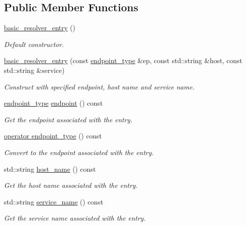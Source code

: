 \subsection*{Public Member Functions}
\begin{DoxyCompactItemize}
\item 
\hyperlink{classasio_1_1ip_1_1basic__resolver__entry_a340f12fc439142f447785325b313d890}{basic\+\_\+resolver\+\_\+entry} ()
\begin{DoxyCompactList}\small\item\em Default constructor. \end{DoxyCompactList}\item 
\hyperlink{classasio_1_1ip_1_1basic__resolver__entry_ac3f49bedc66820627952253c9dca35ea}{basic\+\_\+resolver\+\_\+entry} (const \hyperlink{classasio_1_1ip_1_1basic__resolver__entry_ad0d9f222f3a4897afa941c35e1a90074}{endpoint\+\_\+type} \&ep, const std\+::string \&host, const std\+::string \&service)
\begin{DoxyCompactList}\small\item\em Construct with specified endpoint, host name and service name. \end{DoxyCompactList}\item 
\hyperlink{classasio_1_1ip_1_1basic__resolver__entry_ad0d9f222f3a4897afa941c35e1a90074}{endpoint\+\_\+type} \hyperlink{classasio_1_1ip_1_1basic__resolver__entry_ade049c1db52069e46f5cc933f1979a74}{endpoint} () const 
\begin{DoxyCompactList}\small\item\em Get the endpoint associated with the entry. \end{DoxyCompactList}\item 
\hyperlink{classasio_1_1ip_1_1basic__resolver__entry_a343af6c1865a960c2515f038ab11c1f6}{operator endpoint\+\_\+type} () const 
\begin{DoxyCompactList}\small\item\em Convert to the endpoint associated with the entry. \end{DoxyCompactList}\item 
std\+::string \hyperlink{classasio_1_1ip_1_1basic__resolver__entry_abd04bdb2a751495e176994f7daae937f}{host\+\_\+name} () const 
\begin{DoxyCompactList}\small\item\em Get the host name associated with the entry. \end{DoxyCompactList}\item 
std\+::string \hyperlink{classasio_1_1ip_1_1basic__resolver__entry_a12637600b60e7b33d191d8705750627c}{service\+\_\+name} () const 
\begin{DoxyCompactList}\small\item\em Get the service name associated with the entry. \end{DoxyCompactList}\end{DoxyCompactItemize}


